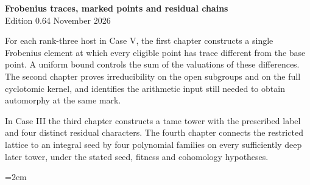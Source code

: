 \begin{center}
{\Large\bfseries Frobenius traces, marked points and residual chains}\\[4pt]
Edition 0.64  November 2026
\end{center}

For each rank-three host in Case V, the first chapter constructs a single
Frobenius element at which every eligible point has trace different from
the base point. A uniform bound controls the sum of the valuations of these
differences. The second chapter proves irreducibility on the open
subgroups and on the full cyclotomic kernel, and identifies the arithmetic
input still needed to obtain automorphy at the same mark.

In Case III the third chapter constructs a tame tower with the prescribed
label and four distinct residual characters. The fourth chapter connects
the restricted lattice to an integral seed by four polynomial families on
every sufficiently deep later tower, under the stated seed, fitness and
cohomology hypotheses.

\begingroup\emergencystretch=2em




\endgroup
